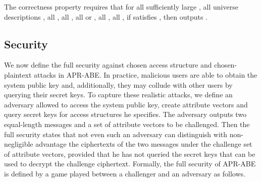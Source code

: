 \documentclass[twocolumn]{svjour3}          \smartqed  \usepackage{graphicx}
\begin{document}
The correctness property requires that for all sufficiently large , all universe descriptions , all , all , all  or , all , all , if  satisfies , then
 outputs .

\subsection{Security}
We now define the full security against chosen access structure and chosen-plaintext attacks in APR-ABE. In practice, malicious users are able to obtain the system public
key and, additionally, they may collude with other users by querying their secret keys. To capture these realistic attacks, we define an adversary  allowed to access the system public key, create attribute vectors and query secret keys for access structures he specifies. The adversary outputs two equal-length messages and a set of attribute vectors to be challenged. Then the full security states that not even such an adversary can distinguish with non-negligible
advantage the ciphertexts of the two messages
under the challenge set of attribute vectors, provided
that he has not queried the secret keys that can be used to decrypt the challenge ciphertext. Formally, the full security of APR-ABE is defined by a game played between a challenger  and an adversary  as follows.
\end{document}
